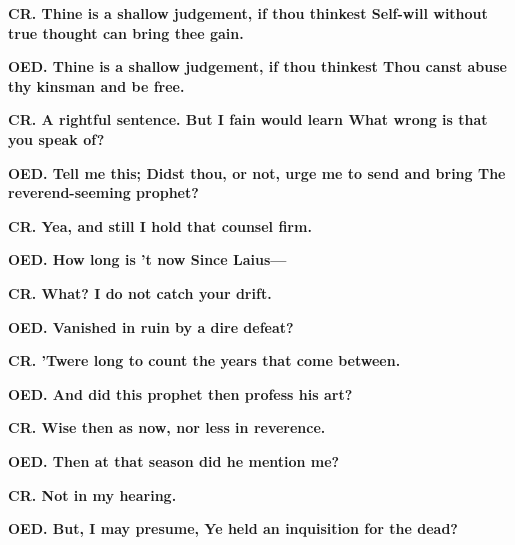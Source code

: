 \documentclass[11pt,letter]{book}
\begin{document}
\par \textbf{CR. Thine is a shallow judgement, if thou thinkest Self-will without true thought can bring thee gain.}
\par 

\par \textbf{OED. Thine is a shallow judgement, if thou thinkest Thou canst abuse thy kinsman and be free.}
\par 

\par \textbf{CR. A rightful sentence. But I fain would learn What wrong is that you speak of?}
\par 

\par \textbf{OED. Tell me this; Didst thou, or not, urge me to send and bring The reverend-seeming prophet?}
\par 

\par \textbf{CR. Yea, and still I hold that counsel firm.}
\par 

\par \textbf{OED. How long is ’t now Since Laius—}
\par 

\par \textbf{CR. What? I do not catch your drift.}
\par 

\par \textbf{OED. Vanished in ruin by a dire defeat?}
\par 

\par \textbf{CR. ’Twere long to count the years that come between.}
\par 

\par \textbf{OED. And did this prophet then profess his art?}
\par 

\par \textbf{CR. Wise then as now, nor less in reverence.}
\par 

\par \textbf{OED. Then at that season did he mention me?}
\par 

\par \textbf{CR. Not in my hearing.}
\par 

\par \textbf{OED. But, I may presume, Ye held an inquisition for the dead?}
\par 
\end{document}
